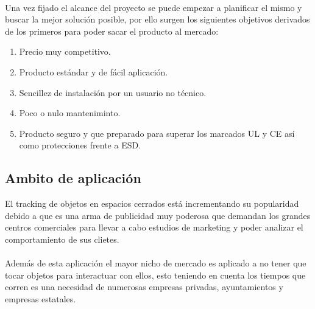 \documentclass[a4paper ,12pt, onecolumn]{article}
\begin{document}
        \paragraph{}
        Una vez fijado el alcance del proyecto se puede empezar a planificar el mismo y buscar la mejor solución 
        posible, por ello surgen los siguientes objetivos derivados de los primeros para poder sacar el producto 
        al mercado:
        \begin{enumerate}
            \item Precio muy competitivo.
            \item Producto estándar y de fácil aplicación.
            \item Sencillez de instalación por un usuario no técnico.
            \item Poco o nulo manteniminto.
            \item Producto seguro y que preparado para superar los marcados UL y CE así como protecciones frente a ESD.
        \end{enumerate}
    \subsection{Ambito de aplicación}
        El tracking de objetos en espacios cerrados está incrementando su popularidad debido a que es una 
        arma de publicidad muy poderosa que demandan los grandes centros comerciales para llevar a cabo estudios de marketing
        y poder analizar el comportamiento de sus clietes.
        \paragraph{}
        Además de esta aplicación el mayor nicho de mercado es aplicado a no tener que tocar objetos para interactuar con ellos, 
        esto teniendo en cuenta los tiempos que corren es una necesidad de numerosas empresas privadas, ayuntamientos 
        y empresas estatales.
\end{document}
